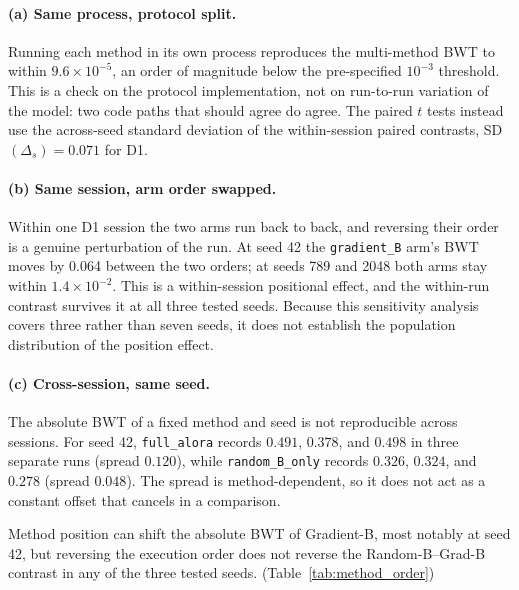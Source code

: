\paragraph{(a) Same process, protocol split.} Running each method in its own
process reproduces the multi-method BWT to within $9.6\times10^{-5}$, an order of
magnitude below the pre-specified $10^{-3}$ threshold. This is a check on the
protocol implementation, not on run-to-run variation of the model: two code
paths that should agree do agree. The paired $t$ tests instead use the
across-seed standard deviation of the within-session paired contrasts,
SD$(\Delta_s)=0.071$ for D1.

\paragraph{(b) Same session, arm order swapped.} Within one D1 session the two
arms run back to back, and reversing their order is a genuine perturbation of
the run. At seed 42 the \texttt{gradient\_B} arm's BWT moves by 0.064 between the
two orders; at seeds 789 and 2048 both arms
stay within $1.4\times10^{-2}$. This is a within-session positional effect, and
the within-run contrast survives it at all three tested seeds. Because this
sensitivity analysis covers three rather than seven seeds, it does not establish
the population distribution of the position effect.

\paragraph{(c) Cross-session, same seed.} The absolute BWT of a fixed method and
seed is not reproducible across sessions. For seed 42, \texttt{full\_alora}
records $0.491$, $0.378$, and $0.498$ in three separate runs (spread $0.120$),
while \texttt{random\_B\_only} records $0.326$, $0.324$, and $0.278$ (spread
$0.048$). The spread is method-dependent, so it does not act as a constant offset
that cancels in a comparison.

Method position can shift the absolute BWT of Gradient-B, most notably at seed 42, but reversing the execution order does not reverse the Random-B–Grad-B contrast in any of the three tested seeds. (Table~\ref{tab:method_order})

